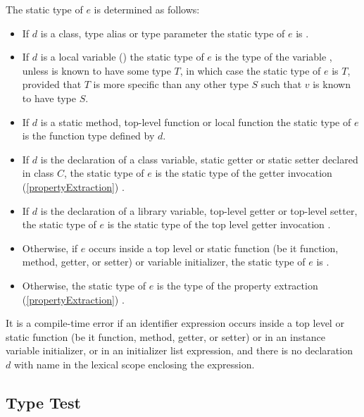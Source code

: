 \documentclass[makeidx]{article}
\begin{document}
\LMHash{}%
The static type of $e$ is determined as follows:

\begin{itemize}
\item If $d$ is a class, type alias or type parameter the static type of $e$ is .
\item If $d$ is a local variable ()
  the static type of $e$ is the type of the variable \id,
  unless \id{} is known to have some type $T$,
  in which case the static type of $e$ is $T$,
  provided that $T$ is more specific than any other type $S$ such that $v$ is known to have type $S$.
\item If $d$ is a static method, top-level function or local function the static type of $e$ is the function type defined by $d$.
\item If $d$ is the declaration of a class variable, static getter or static setter declared in class $C$,
  the static type of $e$ is the static type of the getter invocation (\ref{propertyExtraction}) .
\item If $d$ is the declaration of a library variable, top-level getter or top-level setter,
  the static type of $e$ is the static type of the top level getter invocation \id.
\item Otherwise, if $e$ occurs inside a top level or static function (be it function, method, getter, or setter) or variable initializer,
  the static type of $e$ is \DYNAMIC{}.
\item Otherwise, the static type of $e$ is the type of the property extraction (\ref{propertyExtraction}) .
\end{itemize}



\LMHash{}%
It is a compile-time error if an identifier expression \id{} occurs inside a top level or static function
(be it function, method, getter, or setter)
or in an instance variable initializer,
or in an initializer list expression,
and there is no declaration $d$ with name \id{} in the lexical scope enclosing the expression.


\subsection{Type Test}
\end{document}
